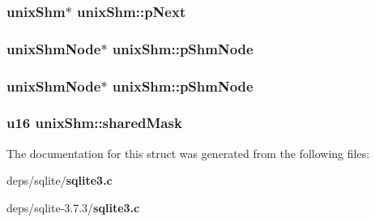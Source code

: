 \subsubsection{\setlength{\rightskip}{0pt plus 5cm}\bf{unix\-Shm}$\ast$ \bf{unix\-Shm::p\-Next}}\label{structunixShm_b54b7971df09bfa1e8a6ba8e324f5a16}


\subsubsection{\setlength{\rightskip}{0pt plus 5cm}\bf{unix\-Shm\-Node}$\ast$ \bf{unix\-Shm::p\-Shm\-Node}}\label{structunixShm_adb2fa1839725cfc95887da952b90529}


\subsubsection{\setlength{\rightskip}{0pt plus 5cm}\bf{unix\-Shm\-Node}$\ast$ \bf{unix\-Shm::p\-Shm\-Node}}\label{structunixShm_adb2fa1839725cfc95887da952b90529}


\subsubsection{\setlength{\rightskip}{0pt plus 5cm}\bf{u16} \bf{unix\-Shm::shared\-Mask}}\label{structunixShm_e9d4f194b8084dc44b84dc6fa5bc5a27}




The documentation for this struct was generated from the following files:\begin{CompactItemize}
\item 
deps/sqlite/\bf{sqlite3.c}\item 
deps/sqlite-3.7.3/\bf{sqlite3.c}\end{CompactItemize}
